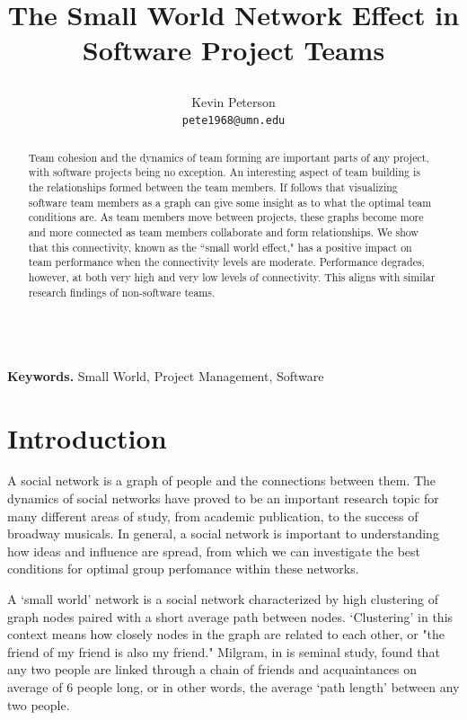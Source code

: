 \documentclass{proc}
\title{
The Small World Network Effect in Software Project Teams
\author{Kevin Peterson\\
\small \texttt{pete1968@umn.edu}
}
}
\begin{document}
\maketitle

\begin{abstract}
Team cohesion and the dynamics of team forming are important parts of any project, with software projects being no exception. An interesting aspect of team building is the relationships formed between the team members. If follows that visualizing software team members as a graph can give some insight as to what the optimal team conditions are. As team members move between projects, these graphs become more and more connected as team members collaborate and form relationships. We show that this connectivity, known as the ``small world effect," has a positive impact on team performance when the connectivity levels are moderate. Performance degrades, however, at both very high and very low levels of connectivity. This aligns with similar research findings of non-software teams.
\end{abstract}

\noindent \\\textbf{Keywords.} Small World, Project Management, Software

\section{Introduction}
A social network is a graph of people and the connections between them. The dynamics of social networks have proved to be an important research topic for many different areas of study, from academic publication\cite{barabasi2002evolution}, to the success of broadway musicals\cite{uzzi2005collaboration}. In general, a social network is important to understanding how ideas and influence are spread\cite{kempe2003maximizing}, from which we can investigate the best conditions for optimal group perfomance within these networks.

A `small world' network is a social network characterized by high clustering of graph nodes paired with a short average path between nodes\cite{watts1998collective}. `Clustering' in this context means how closely nodes in the graph are related to each other, or "the friend of my friend is also my friend." Milgram, in is seminal study, found that any two people are linked through a chain of friends and acquaintances on average of 6 people long\cite{milgram1967small}, or in other words, the average `path length' between any two people.
\end{document}
